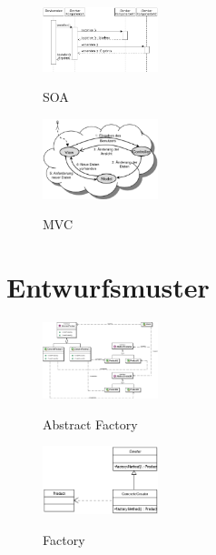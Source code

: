 \begin{figure}[h]
	\begin{center}
		\includegraphics[width=0.3\textwidth]{images/soa}
		\label{fig:soa}
		\caption{SOA}
	\end{center}
\end{figure}

\begin{figure}[h]
	\begin{center}
		\includegraphics[width=0.3\textwidth]{images/mvc}
		\label{fig:mvc}
		\caption{MVC}
	\end{center}
\end{figure}

\clearpage

\section{Entwurfsmuster}

\begin{figure}[h]
	\begin{center}
		\includegraphics[width=0.3\textwidth]{images/abstract_factory}
		\label{fig:abstract_factory}
		\caption{Abstract Factory}
	\end{center}
\end{figure}

\begin{figure}[h]
	\begin{center}
		\includegraphics[width=0.3\textwidth]{images/factory}
		\label{fig:factory}
		\caption{Factory}
	\end{center}
\end{figure}

